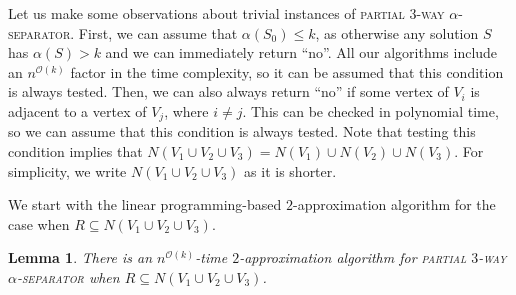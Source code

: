 \documentclass[11pt]{article}
\newtheorem{lemma}{Lemma}[section]
\theoremstyle{definition}
\newcommand{\OO}{\mathcal{O}}
\begin{document}
Let us make some observations about trivial instances of \textsc{partial 3-way $\alpha$-separator}.
First, we can assume that $\alpha(S_0) \le k$, as otherwise any solution $S$ has $\alpha(S) > k$ and we can immediately return ``no''.
All our algorithms include an $n^{\OO(k)}$ factor in the time complexity, so it can be assumed that this condition is always tested.
Then, we can also always return ``no'' if some vertex of $V_i$ is adjacent to a vertex of $V_j$, where $i \neq j$.
This can be checked in polynomial time, so we can assume that this condition is always tested.
Note that testing this condition implies that $N(V_1 \cup V_2 \cup V_3) = N(V_1) \cup N(V_2) \cup N(V_3)$. 
For simplicity, we write $N(V_1 \cup V_2 \cup V_3)$ as it is shorter.

\medskip

We start with the linear programming-based $2$-approximation algorithm for the case when $R \subseteq N(V_1 \cup V_2 \cup V_3)$.

\begin{lemma}
\label{lem:sepapxLP}
There is an $n^{\OO(k)}$-time $2$-approximation algorithm for \textsc{partial $3$-way $\alpha$-separator} when $R \subseteq N(V_1 \cup V_2 \cup V_3)$.
\end{lemma}
\end{document}
